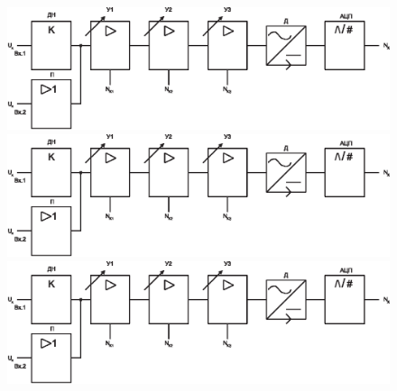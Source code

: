 \begin{figure}[H]
\begin{center}
  \captionsetup{width=50mm,
      }%
\begin{minipage}[h]{0.3\linewidth}
\includegraphics[width=1\linewidth]{./about/func_in}
\caption{} %
\label{ris:expe1} %
\end{minipage}
\hfill
\begin{minipage}[h]{0.3\linewidth}
\includegraphics[width=1\linewidth]{./about/func_in}
\caption{}
\label{ris:expe2}
\end{minipage}
\hfill
\begin{minipage}[h]{0.3\linewidth}
\includegraphics[width=1\linewidth]{./about/func_in}
\caption{}
\label{ris:expe3}
\end{minipage}
\end{center}
\end{figure}








